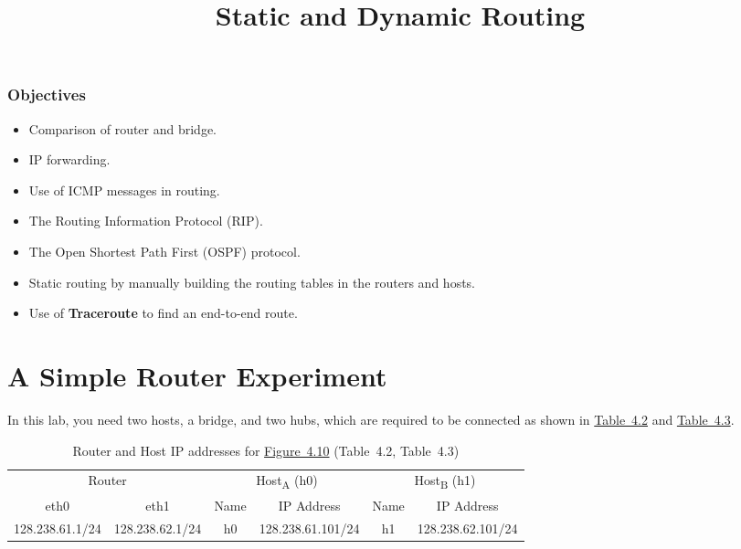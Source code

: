 \documentclass{../UTNetLab}
\title{Static and Dynamic Routing}
\begin{document}
\section*{Objectives}
\begin{itemize}
    \item Comparison of router and bridge.
    \item IP forwarding.
    \item Use of ICMP messages in routing.
    \item The Routing Information Protocol (RIP).
    \item The Open Shortest Path First (OSPF) protocol.
    \item Static routing by manually building the routing tables in the routers and hosts.
    \item Use of \textbf{Traceroute} to find an end-to-end route.
\end{itemize}

\part{A Simple Router Experiment}
In this lab, you need two hosts, a bridge, and two hubs, which are required to be connected as shown in \hyperref[tab:4.2]{Table~4.2} and \hyperref[tab:4.3]{Table~4.3}.
\begin{table}[H]
    \caption{Router and Host IP addresses for \hyperref[fig:4.10]{Figure~4.10} (Table~4.2\label{tab:4.2}, Table~4.3\label{tab:4.3})}
    \centering
    \begin{tabular}{ *2c | *2c | *2c }
        \hline \hline
        \multicolumn{2}{c|}{Router} & \multicolumn{2}{c|}{Host\textsubscript{A} (h0)} & \multicolumn{2}{c}{Host\textsubscript{B} (h1)}                                                \\
        eth0                        & eth1                                            & Name                                           & IP Address        & Name & IP Address        \\
        \hline
        128.238.61.1/24             & 128.238.62.1/24                                 & h0                                             & 128.238.61.101/24 & h1   & 128.238.62.101/24 \\
        \hline \hline
    \end{tabular}
\end{table}
\end{document}
